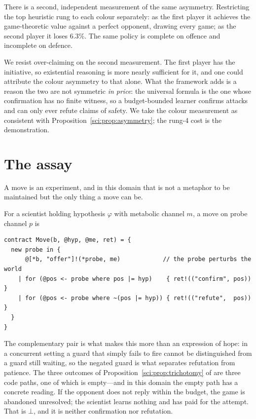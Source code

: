 There is a second, independent measurement of the same asymmetry. Restricting
the top heuristic rung to each colour separately: as the first player it
achieves the game-theoretic value against a perfect opponent, drawing every
game; as the second player it loses $6.3\%$. The same policy is complete on
offence and incomplete on defence.

\begin{remark}\label{gam:reading-offered-as-such}
We resist over-claiming on the second measurement. The first player has the
initiative, so existential reasoning is more nearly sufficient for it, and one
could attribute the colour asymmetry to that alone. What the framework adds is a
reason the two are not symmetric \emph{in price}: the universal formula is the
one whose confirmation has no finite witness, so a budget-bounded learner
confirms attacks and can only ever refute claims of safety. We take the colour
measurement as consistent with Proposition~\ref{sci:prop:asymmetry}; the rung-4 cost is the
demonstration.
\end{remark}

\section{The assay}\label{gam:sec:assay}\label{gam:S6}

A move is an experiment, and in this domain that is not a metaphor to be
maintained but the only thing a move can be.

\begin{definition}\label{gam:move-assay}
For a scientist holding hypothesis $\varphi$ with metabolic channel $m$,
a move on probe channel $p$ is
\begin{center}
\begin{minipage}{0.9\textwidth}
\begin{lstlisting}
contract Move(b, @hyp, @me, ret) = {
  new probe in {
      @[*b, "offer"]!(*probe, me)            // the probe perturbs the world
    | for (@pos <- probe where pos |= hyp)    { ret!(("confirm", pos)) }
    | for (@pos <- probe where ~(pos |= hyp)) { ret!(("refute",  pos)) }
  }
}
\end{lstlisting}
\end{minipage}
\end{center}
\end{definition}

The complementary pair is what makes this more than an expression of hope: in a
concurrent setting a guard that simply fails to fire cannot be distinguished
from a guard still waiting, so the negated guard is what separates refutation
from patience. The three outcomes of Proposition~\ref{sci:prop:trichotomy} of \chSci are
three code paths, one of which is empty---and in this domain the empty path has
a concrete reading. If the opponent does not reply within the budget, the game
is abandoned unresolved; the scientist learns nothing and has paid for the
attempt. That is $\bot$, and it is neither confirmation nor refutation.

